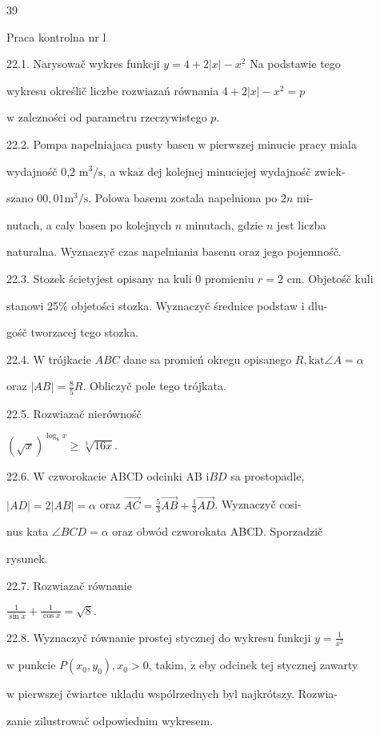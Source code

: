\documentclass[a4paper,12pt]{article}
\begin{document}
39

Praca kontrolna nr l

22.1. Narysowač wykres funkcji $y = 4+2|x| -x^{2}$ Na podstawie tego

wykresu określič liczbe rozwiazań równania $4 + 2|x| - x^{2} = p$

$\mathrm{w}$ zalezności od parametru rzeczywistego $p.$

22.2. Pompa napelniajaca pusty basen $\mathrm{w}$ pierwszej minucie pracy miala

wydajnośč 0,2 $\mathrm{m}^{3}/\mathrm{s}$, a $\mathrm{w}\mathrm{k}\mathrm{a}\dot{\mathrm{z}}$ dej kolejnej minuciejej wydajnośč zwiek-

szano $0 0,01 \mathrm{m}^{3}/\mathrm{s}$. Polowa basenu zostala napelniona po $2n$ mi-

nutach, a caly basen po kolejnych $n$ minutach, gdzie $n$ jest liczba

naturalna. Wyznaczyč czas napelniania basenu oraz jego pojemnośč.

22.3. Stozek ścietyjest opisany na kuli $0$ promieniu $r=2$ cm. Objetośč kuli

stanowi 25\% objetości stozka. Wyznaczyč średnice podstaw $\mathrm{i}$ dlu-

gośč tworzacej tego stozka.

22.4. $\mathrm{W}$ trójkacie $ABC$ dane sa promień okregu opisanego $R, \mathrm{k}\mathrm{a}\mathrm{t}\angle A=\alpha$

oraz $|AB|=\displaystyle \frac{8}{5}R$. Obliczyč pole tego trójkata.

22.5. Rozwiazač nierównośč

$(\sqrt{x})^{\log_{8}x}\geq\sqrt[3]{16x}.$

22.6. $\mathrm{W}$ czworokacie ABCD odcinki AB $\mathrm{i} BD$ sa prostopadle,

$|AD| = 2|AB| = \alpha$ oraz $\vec{AC}= \displaystyle \frac{5}{3} \vec{AB} +\displaystyle \frac{1}{3} \vec{AD}$. Wyznaczyč cosi-

nus kata $\angle BCD = \alpha$ oraz obwód czworokata ABCD. Sporzadzič

rysunek.

22.7. Rozwiazač równanie

$\displaystyle \frac{1}{\sin x}+\frac{1}{\cos x}=\sqrt{8}.$

22.8. Wyznaczyč równanie prostej stycznej do wykresu funkcji $y = \displaystyle \frac{1}{x^{2}}$

$\mathrm{w}$ punkcie $P(x_{0},y_{0}), x_{0}>0$, takim, $\dot{\mathrm{z}}$ eby odcinek tej stycznej zawarty

$\mathrm{w}$ pierwszej čwiartce ukladu wspólrzednych byl najkrótszy. Rozwia-

zanie zilustrowač odpowiednim wykresem.
\end{document}
